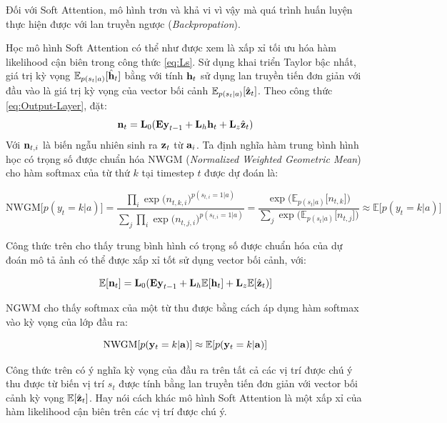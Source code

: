 \documentclass[14pt, a4paper]{article}
\numberwithin{equation}{section}
\numberwithin{algorithm}{section}
\numberwithin{figure}{section}
\numberwithin{table}{section}
\numberwithin{dl}{section}
\numberwithin{md}{section}
\numberwithin{bd}{section}
\numberwithin{dn}{section}
\numberwithin{hq}{section}
\begin{document}
\begin{enumerate}[label=(\alph*)]
        Đối với Soft Attention, mô hình trơn và khả vi vì vậy mà quá trình huấn luyện thực hiện được với lan truyền ngược (\textit{Backpropation}).

        Học mô hình Soft Attention có thể như được xem là xấp xỉ tối ưu hóa hàm likelihood cận biên trong công thức \ref{eq:Ls}.
        Sử dụng khai triển Taylor bậc nhất, giá trị kỳ vọng $\mathbb{E}_{p(s_t \vert a)}\lbrack \hat{\bold{h}}_t \rbrack$ bằng với tính $\bold{h}_t$ sử dụng lan truyền tiến đơn giản với đầu vào là giá trị kỳ vọng của vector bối cảnh $\mathbb{E}_{p(s_t \vert a)}\lbrack \hat{\bold{z}}_t \rbrack$.
        Theo công thức \ref{eq:Output-Layer}, đặt:
        \begin{equation}
            \bold{n}_t = \bold{L}_0(\bold{Ey}_{t-1} + \bold{L}_h\bold{h}_t + \bold{L}_z \hat{\bold{z}}_t)
        \end{equation}
        Với $\bold{n}_{t,i}$ là biến ngẫu nhiên sinh ra $\bold{z}_t$ từ $\bold{a}_i$. Ta định nghĩa hàm trung bình hình học có trọng số được chuẩn hóa NWGM (\textit{Normalized Weighted Geometric Mean}) cho hàm softmax của từ thứ $k$ tại timestep $t$ được dự đoán là:

        \begin{equation}
            \mathrm{NWGM}\lbrack p(y_t=k\vert a) \rbrack=\dfrac{\displaystyle \prod_i \exp\big( n_{t, k, i} \big)^{p(s_{t,i}=1\vert a)}}{\displaystyle \sum_j \prod_i \exp\big( n_{t, j, i} \big)^{p(s_{t,i}=1\vert a)}}=\dfrac{\exp\big( \mathbb{E}_{p(s_t \vert a)} \lbrack n_{t,k} \rbrack  \big)}{\displaystyle \sum_j \exp \big(\mathbb{E}_{p(s_t \vert a)} \lbrack n_{t,j} \rbrack \big)}\approx \mathbb{E} \lbrack p(y_t=k \vert a)\rbrack
        \end{equation}

        Công thức trên cho thấy trung bình hình có trọng số được chuẩn hóa của dự đoán mô tả ảnh có thể được xấp xỉ tốt sử dụng vector bối cảnh, với:

        \begin{equation}
            \mathbb {E}\lbrack \bold{n}_t \rbrack = \bold{L}_0(\bold{Ey}_{t-1} + \bold{L}_h \mathbb{E} \lbrack \bold{h}_t \rbrack + \bold{L}_z \mathbb{E} \lbrack \hat{\bold{z}}_t) \rbrack
        \end{equation}

        NGWM cho thấy softmax của một từ thu được bằng cách áp dụng hàm softmax vào kỳ vọng của lớp đầu ra:

        \begin{equation}
            \mathrm{NWGM}\lbrack p(\bold{y}_t = k \vert \bold{a}) \rbrack \approx \mathbb{E} \lbrack p(\bold{y}_t = k \vert \bold{a}) \rbrack
        \end{equation}

        Công thức trên có ý nghĩa kỳ vọng của đầu ra trên tất cả các vị trí được chú ý thu được từ biến vị trí $s_t$ được tính bằng lan truyền tiến đơn giản với vector bối cảnh kỳ vọng $\mathbb{E} \lbrack \hat{\bold{z}}_t \rbrack$.
        Hay nói cách khác mô hình Soft Attention là một xấp xỉ của hàm likelihood cận biên trên các vị trí được chú ý.
    \end{enumerate}
\end{document}
